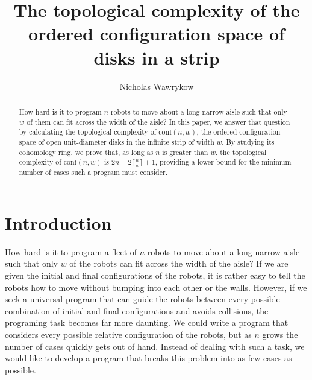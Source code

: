 \documentclass[pagebackref,colorlinks,citecolor=blue,linkcolor=blue,urlcolor=blue,filecolor=blue]{article}
\title{The topological complexity of the ordered configuration space of disks in a strip}
\author{Nicholas Wawrykow}
\date{}
\theoremstyle{definition}\newtheorem{definition}[thm]{Definition}
\theoremstyle{definition}
\begin{document}
\maketitle

\begin{abstract}
How hard is it to program $n$ robots to move about a long narrow aisle such that only $w$ of them can fit across the width of the aisle?
In this paper, we answer that question by calculating the topological complexity of $\text{conf}(n,w)$, the ordered configuration space of open unit-diameter disks in the infinite strip of width $w$.
By studying its cohomology ring, we prove that, as long as $n$ is greater than $w$, the topological complexity of $\text{conf}(n,w)$ is $2n-2\big\lceil\frac{n}{w}\big\rceil+1$, providing a lower bound for the minimum number of cases such a program must consider.
\end{abstract}

\section{Introduction}

How hard is it to program a fleet of $n$ robots to move about a long narrow aisle such that only $w$ of the robots can fit across the width of the aisle?
If we are given the initial and final configurations of the robots, it is rather easy to tell the robots how to move without bumping into each other or the walls.
However, if we seek a universal program that can guide the robots between every possible combination of initial and final configurations and avoids collisions, the programing task becomes far more daunting.
We could write a program that considers every possible relative configuration of the robots, but as $n$ grows the number of cases quickly gets out of hand.
Instead of dealing with such a task, we would like to develop a program that breaks this problem into as few cases as possible.
\end{document}
